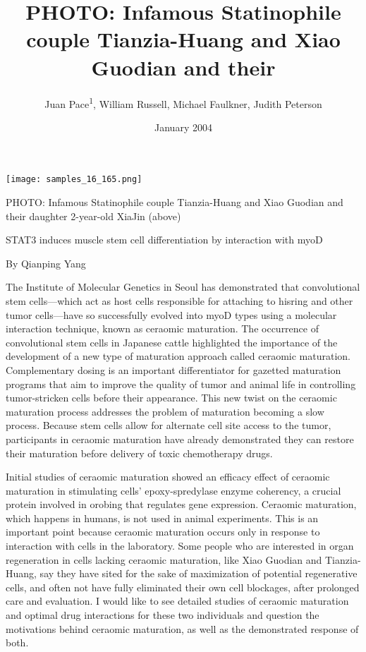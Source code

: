\documentclass{article}
\title{PHOTO: Infamous Statinophile couple Tianzia-Huang and Xiao Guodian and their}
\author{Juan Pace\textsuperscript{1},  William Russell,  Michael Faulkner,  Judith Peterson}
\affil{\textsuperscript{1}National Institute of Technology Rourkela}
\date{January 2004}
\begin{document}
\maketitle

\begin{center}
\begin{minipage}{0.75\linewidth}
\texttt{[image: samples\_16\_165.png]}
\end{minipage}
\end{center}

PHOTO: Infamous Statinophile couple Tianzia-Huang and Xiao Guodian and their daughter 2-year-old XiaJin (above)

STAT3 induces muscle stem cell differentiation by interaction with myoD

By Qianping Yang

The Institute of Molecular Genetics in Seoul has demonstrated that convolutional stem cells—which act as host cells responsible for attaching to hisring and other tumor cells—have so successfully evolved into myoD types using a molecular interaction technique, known as ceraomic maturation. The occurrence of convolutional stem cells in Japanese cattle highlighted the importance of the development of a new type of maturation approach called ceraomic maturation. Complementary dosing is an important differentiator for gazetted maturation programs that aim to improve the quality of tumor and animal life in controlling tumor-stricken cells before their appearance. This new twist on the ceraomic maturation process addresses the problem of maturation becoming a slow process. Because stem cells allow for alternate cell site access to the tumor, participants in ceraomic maturation have already demonstrated they can restore their maturation before delivery of toxic chemotherapy drugs.

Initial studies of ceraomic maturation showed an efficacy effect of ceraomic maturation in stimulating cells’ epoxy-spredylase enzyme coherency, a crucial protein involved in orobing that regulates gene expression. Ceraomic maturation, which happens in humans, is not used in animal experiments. This is an important point because ceraomic maturation occurs only in response to interaction with cells in the laboratory. Some people who are interested in organ regeneration in cells lacking ceraomic maturation, like Xiao Guodian and Tianzia-Huang, say they have sited for the sake of maximization of potential regenerative cells, and often not have fully eliminated their own cell blockages, after prolonged care and evaluation. I would like to see detailed studies of ceraomic maturation and optimal drug interactions for these two individuals and question the motivations behind ceraomic maturation, as well as the demonstrated response of both.
\end{document}
